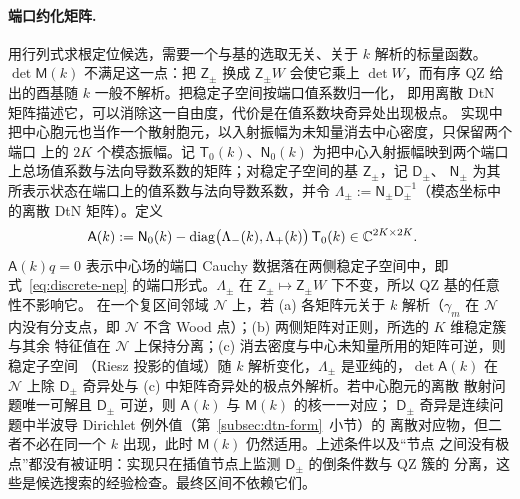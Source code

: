 \paragraph{端口约化矩阵.}
用行列式求根定位候选，需要一个与基的选取无关、关于 $k$ 解析的标量函数。
$\det\mathsf M(k)$ 不满足这一点：把 $\mathsf Z_\pm$ 换成 $\mathsf Z_\pm W$ 会使它乘上
$\det W$，而有序 QZ 给出的酉基随 $k$ 一般不解析。把稳定子空间按端口值系数归一化，
即用离散 DtN 矩阵描述它，可以消除这一自由度，代价是在值系数块奇异处出现极点。
实现中把中心胞元也当作一个散射胞元，以入射振幅为未知量消去中心密度，只保留两个端口
上的 $2K$ 个模态振幅。记 $\mathsf T_0(k)$、$\mathsf N_0(k)$ 为把中心入射振幅映到两个端口
上总场值系数与法向导数系数的矩阵；对稳定子空间的基 $\mathsf Z_\pm$，记 $\mathsf D_\pm$、
$\mathsf N_\pm$ 为其所表示状态在端口上的值系数与法向导数系数，并令
$\Lambda_\pm:=\mathsf N_\pm\mathsf D_\pm^{-1}$（模态坐标中的离散 DtN 矩阵）。定义
\begin{align}
  \mathsf A(k)&:=\mathsf N_0(k)-\operatorname{diag}\bigl(\Lambda_-(k),\Lambda_+(k)\bigr)\,\mathsf T_0(k)
  \in\mathbb{C}^{2K\times2K}.
  \label{eq:port-reduced-matrix}
\end{align}
$\mathsf A(k)q=0$ 表示中心场的端口 Cauchy 数据落在两侧稳定子空间中，即
式~\eqref{eq:discrete-nep} 的端口形式。$\Lambda_\pm$ 在 $\mathsf Z_\pm\mapsto\mathsf Z_\pm W$
下不变，所以 QZ 基的任意性不影响它。
在一个复区间邻域 $\mathcal N$ 上，若 (a) 各矩阵元关于 $k$ 解析（$\gamma_m$ 在 $\mathcal N$
内没有分支点，即 $\mathcal N$ 不含 Wood 点）；(b) 两侧矩阵对正则，所选的 $K$ 维稳定簇与其余
特征值在 $\mathcal N$ 上保持分离；(c) 消去密度与中心未知量所用的矩阵可逆，则稳定子空间
（Riesz 投影的值域）随 $k$ 解析变化，$\Lambda_\pm$ 是亚纯的，$\det\mathsf A(k)$ 在
$\mathcal N$ 上除 $\mathsf D_\pm$ 奇异处与 (c) 中矩阵奇异处的极点外解析。若中心胞元的离散
散射问题唯一可解且 $\mathsf D_\pm$ 可逆，则 $\mathsf A(k)$ 与 $\mathsf M(k)$ 的核一一对应；
$\mathsf D_\pm$ 奇异是连续问题中半波导 Dirichlet 例外值（第~\ref{subsec:dtn-form}~小节）的
离散对应物，但二者不必在同一个 $k$ 出现，此时 $\mathsf M(k)$ 仍然适用。上述条件以及“节点
之间没有极点”都没有被证明：实现只在插值节点上监测 $\mathsf D_\pm$ 的倒条件数与 QZ 簇的
分离，这些是候选搜索的经验检查。最终区间不依赖它们。

